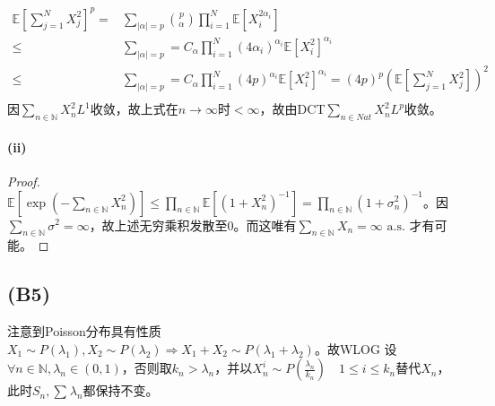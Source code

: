 \documentclass{ctexart}
\begin{document}
\begin{align*}
  \underset{}{\mathbb{E}}\left[ \sum\limits_{j=1}^{N}X_j^2\right]^p=& \sum\limits_{|\alpha|=p}^{}\binom{p}{\alpha} \prod_{i=1}^{N} \underset{}{\mathbb{E}}\left[ X_i^{2\alpha_i}\right]\\
  \leq & \sum_{|\alpha|=p}=C_{\alpha}\prod_{i=1}^{N} (4\alpha_i)^{\alpha_i}\underset{}{\mathbb{E}}\left[ X_i^2\right]^{\alpha_i} \\
  \leq & \sum_{|\alpha|=p}=C_{\alpha}\prod_{i=1}^{N} (4p)^{\alpha_i}\underset{}{\mathbb{E}}\left[ X_i^2\right]^{\alpha_i} =(4p)^p \left( \underset{}{\mathbb{E}}\left[ \sum_{j=1}^N X_j^2\right]  \right)^2\\
\end{align*}
因$\sum_{n\in \mathbb{N}}X_n^2 L^1$收敛，故上式在$n\to\infty$时$<\infty$，故由DCT$\sum\limits_{n\in Nat}^{}X_n^2 L^p$收敛。

\paragraph{(ii)}
\begin{proof}
  $\underset{}{\mathbb{E}}\left[ \exp(-\sum\limits_{n\in \mathbb{N}}^{}X_n^2)\right]\leq \prod_{n\in \mathbb{N}}^{}\underset{}{\mathbb{E}}\left[ (1+X_n^2)^{-1}\right]= \prod_{n\in \mathbb{N}}^{}(1+\sigma_n^2)^{-1}$。因$\sum\limits_{n\in \mathbb{N}}^{}\sigma^2=\infty$，故上述无穷乘积发散至0。而这唯有$\sum\limits_{n\in \mathbb{N}}^{} X_n=\infty \text{ a.s. }$才有可能。
\end{proof}

\subsection{(B5)}
注意到Poisson分布具有性质$X_1\sim P(\lambda_1), X_2\sim P(\lambda_2)\Rightarrow X_1+X_2\sim P(\lambda_1+\lambda_2)$。故WLOG 设$\forall n\in \mathbb{N}, \lambda_n\in (0,1)$，否则取$k_n>\lambda_n$，并以$X_n^i\sim P(\frac{\lambda_n}{k_n}) \quad1 \leq i\leq  k_n$替代$X_n$，此时$S_n, \sum\limits_{}^{}\lambda_n$都保持不变。
\end{document}
